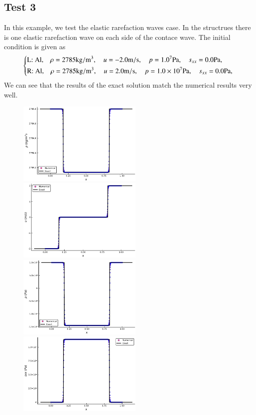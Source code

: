 \documentclass[review]{elsarticle}
\begin{document}
\begin{enumerate}[Step 1]
\subsection{Test 3}
In this example, we test the elastic rarefaction waves case. In the structrues there  is one  elastic rarefaction wave on each side of the contace wave. The initial condition is given as
\begin{equation}
 \left\{ \begin{aligned}
	 &	 \text{L: Al,}\quad  \rho = 2785 \text{kg}/\text{m}^3, \quad  u = -2.0\text{m}/\text{s}, \quad  p = 1.0\time 10^7\text{Pa}, \quad  s_{xx}=0.0 \text{Pa},\\
	 &	 \text{R: Al,}\quad  \rho = 2785 \text{kg}/\text{m}^3, \quad  u = 2.0\text{m}/\text{s}, \quad  p = 1.0\times 10^7 \text{Pa}, \quad  s_{xx}=0.0 \text{Pa},\\
   \end{aligned}
 \right.
\end{equation}
We can see that the results of the exact solution match the numerical results very well.
%
\begin{figure}
  \centering

  \includegraphics[width= 6cm] {case4rho.pdf}
  \includegraphics[width= 6cm] {case4u.pdf}
  \includegraphics[width= 6cm] {case4p.pdf}
  \includegraphics[width= 6cm] {case4sxx.pdf}


\end{figure}
\end{enumerate}
\end{document}
